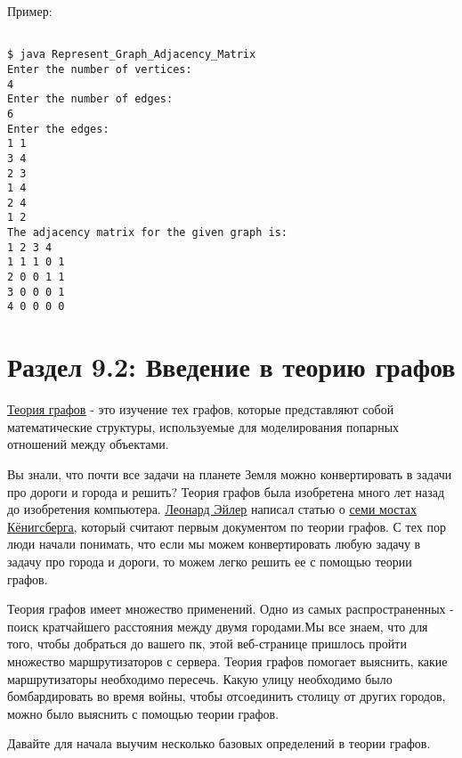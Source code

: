 \vspace{\baselineskip}
Пример:
\begin{tcolorbox}
\begin{verbatim}

$ java Represent_Graph_Adjacency_Matrix
Enter the number of vertices:
4
Enter the number of edges:
6
Enter the edges:
1 1
3 4
2 3
1 4
2 4
1 2
The adjacency matrix for the given graph is:
1 2 3 4
1 1 1 0 1
2 0 0 1 1
3 0 0 0 1
4 0 0 0 0

\end{verbatim}
\end{tcolorbox}

\vspace{-0.2cm}
\section*{Раздел 9.2: Введение в теорию графов}
\href{https://en.wikipedia.org/wiki/Graph_theory}{\underline{Теория графов}} - это изучение тех графов, которые представляют собой математические структуры, используемые для моделирования попарных отношений между объектами.

\vspace{\baselineskip}
Вы знали, что почти все задачи на планете Земля можно конвертировать в задачи про дороги и города и решить? Теория графов была изобретена много лет назад до изобретения компьютера. \href{https://en.wikipedia.org/wiki/Leonhard_Euler}{\underline{Леонард Эйлер}} написал статью о \href{https://en.wikipedia.org/wiki/Seven_Bridges_of_Konigsberg}{\underline{семи мостах Кёнигсберга}}, который считают первым документом по теории графов. С тех пор люди начали понимать, что если мы можем конвертировать любую задачу в задачу про города и дороги, то можем легко решить ее с помощью теории графов.

\vspace{\baselineskip}
Теория графов имеет множество применений. Одно из самых распространенных  - поиск  кратчайшего расстояния между двумя городами.Мы все знаем, что для того, чтобы добраться до вашего пк, этой веб-странице пришлось пройти множество маршрутизаторов с сервера. Теория графов помогает выяснить, какие маршрутизаторы необходимо пересечь. Какую улицу необходимо было бомбардировать во время войны, чтобы отсоединить столицу от других городов, можно было выяснить с помощью теории графов.

\vspace{\baselineskip}
Давайте для начала выучим несколько базовых определений в теории графов.

